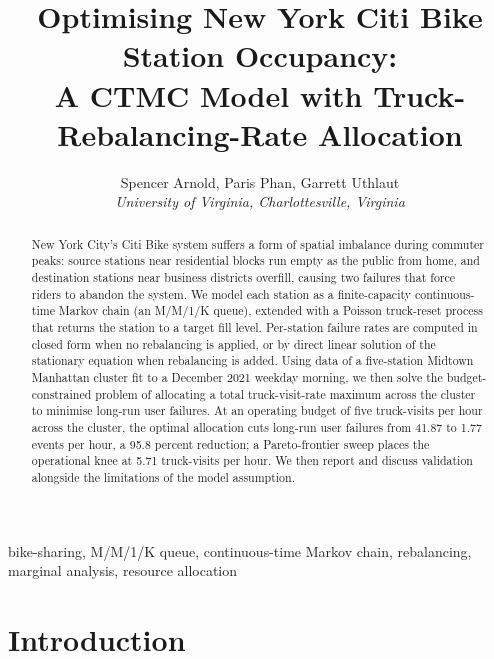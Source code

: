 \documentclass[conference]{IEEEtran}
\begin{document}
\title{Optimising New York Citi Bike Station Occupancy:\\
A CTMC Model with Truck-Rebalancing-Rate Allocation}

\author{
\fontsize{10}{12}\selectfont
Spencer Arnold,
Paris Phan,
Garrett Uthlaut\\
\fontsize{9}{10}\selectfont \textit{University of Virginia, Charlottesville, Virginia}
}

\maketitle

\begin{abstract}
New York City's Citi Bike system suffers a form of spatial imbalance during commuter peaks: source stations near residential blocks run empty as the public from home, and destination stations near business districts overfill, causing two failures that force riders to abandon the system. We model each station as a finite-capacity continuous-time Markov chain (an M/M/1/K queue), extended with a Poisson truck-reset process that returns the station to a target fill level. Per-station failure rates are computed in closed form when no rebalancing is applied, or by direct linear solution of the stationary equation when rebalancing is added. 
Using data of a five-station Midtown Manhattan cluster fit to a December 2021 weekday morning, we then solve the budget-constrained problem of allocating a total truck-visit-rate maximum across the cluster to minimise long-run user failures. At an operating budget of five truck-visits per hour across the cluster, the optimal allocation cuts long-run user failures from 41.87 to 1.77 events per hour, a 95.8 percent reduction; a Pareto-frontier sweep places the operational knee at 5.71 truck-visits per hour. We then report and discuss validation alongside the limitations of the model assumption.
\end{abstract}

\begin{IEEEkeywords}
bike-sharing, M/M/1/K queue, continuous-time Markov chain, rebalancing, marginal analysis, resource allocation
\end{IEEEkeywords}

\section{Introduction}
\end{document}
